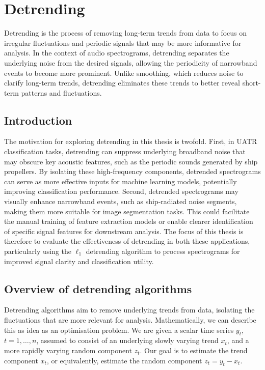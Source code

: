 \chapter{Detrending}

Detrending is the process of removing long-term trends from data to focus on irregular fluctuations and periodic signals that may be more informative for analysis. In the context of audio spectrograms, detrending separates the underlying noise from the desired signals, allowing the periodicity of narrowband events to become more prominent. Unlike smoothing, which reduces noise to clarify long-term trends, detrending eliminates these trends to better reveal short-term patterns and fluctuations.

\section{Introduction}

The motivation for exploring detrending in this thesis is twofold. First, in UATR classification tasks, detrending can suppress underlying broadband noise that may obscure key acoustic features, such as the periodic sounds generated by ship propellers. By isolating these high-frequency components, detrended spectrograms can serve as more effective inputs for machine learning models, potentially improving classification performance. Second, detrended spectrograms may visually enhance narrowband events, such as ship-radiated noise segments, making them more suitable for image segmentation tasks. This could facilitate the manual training of feature extraction models or enable clearer identification of specific signal features for downstream analysis. The focus of this thesis is therefore to evaluate the effectiveness of detrending in both these applications, particularly using the $\ell_1$ detrending algorithm to process spectrograms for improved signal clarity and classification utility.

\section{Overview of detrending algorithms}

Detrending algorithms aim to remove underlying trends from data, isolating the fluctuations that are more relevant for analysis. Mathematically, we can describe this as idea as an optimisation problem. We are given a scalar time series $y_t$, $t = 1, \ldots, n$, assumed to consist of an underlying slowly varying trend $x_t$, and a more rapidly varying random component $z_t$. Our goal is to estimate the trend component $x_t$, or equivalently, estimate the random component $z_t = y_t - x_t$. 

